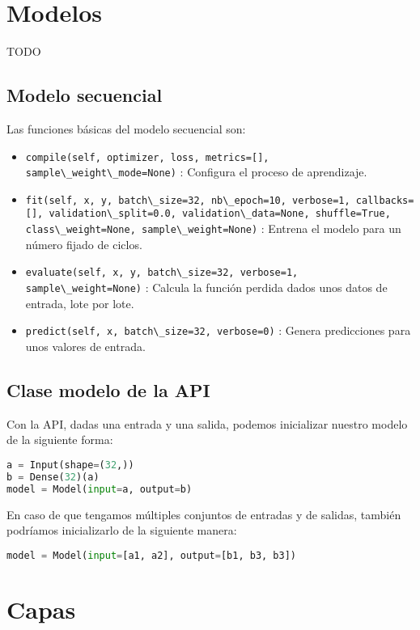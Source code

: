 \section{Modelos}
TODO
\subsection{Modelo secuencial}
Las funciones básicas del modelo secuencial son:
\begin{itemize}
\item \lstinline{compile(self, optimizer, loss, metrics=[], sample\_weight\_mode=None)} : Configura el proceso de aprendizaje.
\item \lstinline{fit(self, x, y, batch\_size=32, nb\_epoch=10, verbose=1, callbacks=[], validation\_split=0.0, validation\_data=None, shuffle=True, class\_weight=None, sample\_weight=None)} : Entrena el modelo para un número fijado de ciclos.
\item \lstinline{evaluate(self, x, y, batch\_size=32, verbose=1, sample\_weight=None)} : Calcula la función perdida dados unos datos de entrada, lote por lote.
\item \lstinline{predict(self, x, batch\_size=32, verbose=0)} : Genera predicciones para unos valores de entrada.
\end{itemize}
\subsection{Clase modelo de la API}
Con la API, dadas una entrada y una salida, podemos inicializar nuestro modelo de la siguiente forma:
\begin{lstlisting}[language=Python]
a = Input(shape=(32,))
b = Dense(32)(a)
model = Model(input=a, output=b)
\end{lstlisting}
En caso de que tengamos múltiples conjuntos de entradas y de salidas, también podríamos inicializarlo de la siguiente manera:
\begin{lstlisting}[language=Python]
model = Model(input=[a1, a2], output=[b1, b3, b3])
\end{lstlisting}
\section{Capas}
